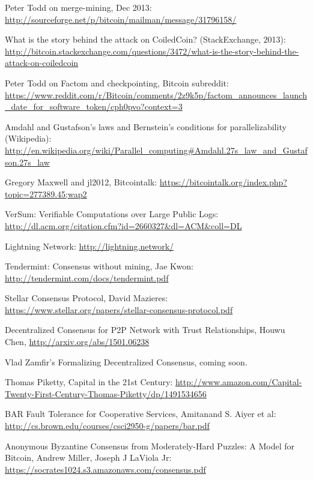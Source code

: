 \documentclass[11pt,a4paper]{article}
\theoremstyle{plain}
\theoremstyle{definition}
\theoremstyle{remark}
\begin{document}
\begin{thebibliography}{39}

    Peter Todd on merge-mining, Dec 2013: \url{http://sourceforge.net/p/bitcoin/mailman/message/31796158/}

    What is the story behind the attack on CoiledCoin? (StackExchange, 2013): \url{http://bitcoin.stackexchange.com/questions/3472/what-is-the-story-behind-the-attack-on-coiledcoin}

    Peter Todd on Factom and checkpointing, Bitcoin subreddit: \url{https://www.reddit.com/r/Bitcoin/comments/2z9k5p/factom_announces_launch_date_for_software_token/cph0pvo?context=3}

    Amdahl and Gustafson's laws and Bernstein's conditions for parallelizability (Wikipedia): \url{http://en.wikipedia.org/wiki/Parallel_computing#Amdahl.27s_law_and_Gustafson.27s_law}

    Gregory Maxwell and jl2012, Bitcointalk: \url{https://bitcointalk.org/index.php?topic=277389.45;wap2}

    VerSum: Verifiable Computations over Large Public Logs: \url{http://dl.acm.org/citation.cfm?id=2660327&dl=ACM&coll=DL}

    Lightning Network: \url{http://lightning.network/}

    Tendermint: Consensus without mining, Jae Kwon: \url{http://tendermint.com/docs/tendermint.pdf}

    Stellar Consensus Protocol, David Mazieres: \url{https://www.stellar.org/papers/stellar-consensus-protocol.pdf}

    Decentralized Consensus for P2P Network with Trust Relationships, Houwu Chen, \url{http://arxiv.org/abs/1501.06238}

    Vlad Zamfir's Formalizing Decentralized Consensus, coming soon.

    Thomas Piketty, Capital in the 21st Century: \url{http://www.amazon.com/Capital-Twenty-First-Century-Thomas-Piketty/dp/1491534656}

    BAR Fault Tolerance for Cooperative Services, Amitanand S. Aiyer et al: \url{http://cs.brown.edu/courses/csci2950-g/papers/bar.pdf}

    Anonymous Byzantine Consensus from Moderately-Hard Puzzles: A Model for Bitcoin, Andrew Miller, Joseph J LaViola Jr: \url{https://socrates1024.s3.amazonaws.com/consensus.pdf}


\end{thebibliography}
\end{document}

